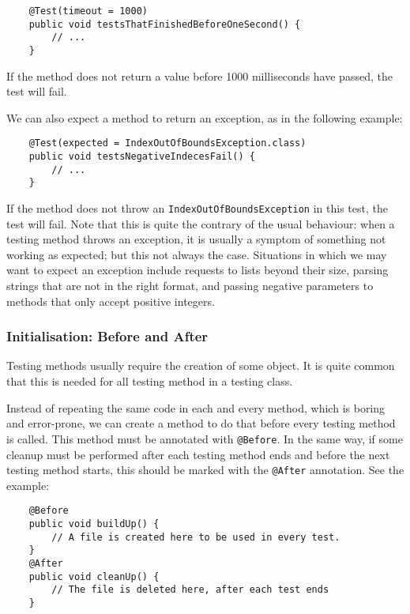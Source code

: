 \begin{verbatim}
    @Test(timeout = 1000)  
    public void testsThatFinishedBeforeOneSecond() {  
        // ...
    }  
\end{verbatim}

If the method does not return a value before 1000 milliseconds have
passed, the test will fail. 

We can also expect a method to return an exception, as in the
following example: 

\begin{verbatim}
    @Test(expected = IndexOutOfBoundsException.class)
    public void testsNegativeIndecesFail() {  
        // ...
    }  
\end{verbatim}

If the method does not throw an \verb+IndexOutOfBoundsException+ in
this test, the test will fail. Note that this is quite the contrary of
the usual behaviour: when a testing method throws an exception, it is
usually a symptom of something not working as expected; but this not
always the case. Situations in which we may want to expect an exception
include requests to lists beyond their size, parsing strings that
are not in the right format, and passing negative parameters to
methods that only accept positive integers. 

\subsubsection*{Initialisation: Before and After}
\label{sec:init-before-after}

Testing methods usually require the creation of some object. It is
quite common that this is needed for all testing method in a testing
class. 

Instead of repeating the same code in each and every method, which
is boring and error-prone, we can create a method to do that before
every testing method is called. This method must be annotated with
\verb+@Before+. In the same way, if some cleanup must be performed
after each testing method ends and before the next testing method
starts, this should be marked with the \verb+@After+ annotation. See
the example: 

\begin{verbatim}
    @Before
    public void buildUp() {  
        // A file is created here to be used in every test. 
    }  
    @After
    public void cleanUp() {  
        // The file is deleted here, after each test ends
    }  
\end{verbatim}

